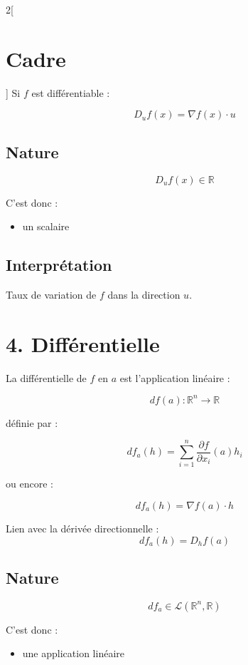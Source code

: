 \documentclass[a4paper,12pt]{article}
\begin{document}
\begin{multicols}{2}[
    \section*{Cadre}
    ]
        Si $f$ est différentiable :

        $$
        D_u f(x)=\nabla f(x)\cdot u
        $$

        \subsection*{Nature}

        $$
        D_u f(x)\in\mathbb{R}
        $$

        C'est donc :
        \begin{itemize}
            \item un scalaire
        \end{itemize}

        \subsection*{Interprétation}

        Taux de variation de $f$ dans la direction $u$.

    \section*{4. Différentielle}

        La différentielle de $f$ en $a$ est l'application linéaire :

        $$
        df(a):\mathbb{R}^n\to\mathbb{R}
        $$

        définie par :

        $$
        df_a(h)
        =
        \sum_{i=1}^n
        \frac{\partial f}{\partial x_i}(a)h_i
        $$

        ou encore :

        $$
        df_a(h)=\nabla f(a)\cdot h
        $$

        Lien avec la dérivée directionnelle :
        $$
        df_a(h)=D_h f(a)
        $$


        \subsection*{Nature}

        $$
        df_a\in\mathcal{L}(\mathbb{R}^n,\mathbb{R})
        $$

        C'est donc :
        \begin{itemize}
            \item une application linéaire
        \end{itemize}


\end{multicols}
\end{document}
